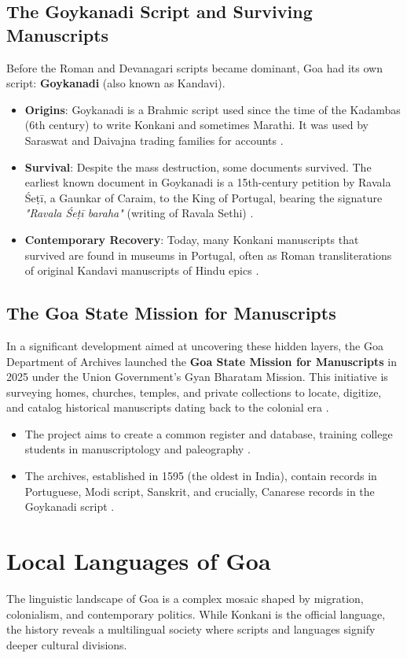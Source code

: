 \documentclass[12pt,a4paper]{article}
\begin{document}
\subsection{The Goykanadi Script and Surviving Manuscripts}
Before the Roman and Devanagari scripts became dominant, Goa had its own script: \textbf{Goykanadi} (also known as Kandavi).
\begin{itemize}
    \item \textbf{Origins}: Goykanadi is a Brahmic script used since the time of the Kadambas (6th century) to write Konkani and sometimes Marathi. It was used by Saraswat and Daivajna trading families for accounts \cite{Omniglot2023}.
    \item \textbf{Survival}: Despite the mass destruction, some documents survived. The earliest known document in Goykanadi is a 15th-century petition by Ravala Śeṭī, a Gaunkar of Caraim, to the King of Portugal, bearing the signature \textit{"Ravala Śeṭī baraha"} (writing of Ravala Sethi) \cite{Wikimedia2025}.
    \item \textbf{Contemporary Recovery}: Today, many Konkani manuscripts that survived are found in museums in Portugal, often as Roman transliterations of original Kandavi manuscripts of Hindu epics \cite{Wikimedia2025}.
\end{itemize}

\subsection{The Goa State Mission for Manuscripts}
In a significant development aimed at uncovering these hidden layers, the Goa Department of Archives launched the \textbf{Goa State Mission for Manuscripts} in 2025 under the Union Government's Gyan Bharatam Mission. This initiative is surveying homes, churches, temples, and private collections to locate, digitize, and catalog historical manuscripts dating back to the colonial era \cite{IndiaToday2025}.
\begin{itemize}
    \item The project aims to create a common register and database, training college students in manuscriptology and paleography \cite{Lambe2025}.
    \item The archives, established in 1595 (the oldest in India), contain records in Portuguese, Modi script, Sanskrit, and crucially, Canarese records in the Goykanadi script \cite{IndiaToday2025}.
\end{itemize}

\section{Local Languages of Goa}
The linguistic landscape of Goa is a complex mosaic shaped by migration, colonialism, and contemporary politics. While Konkani is the official language, the history reveals a multilingual society where scripts and languages signify deeper cultural divisions.
\end{document}
